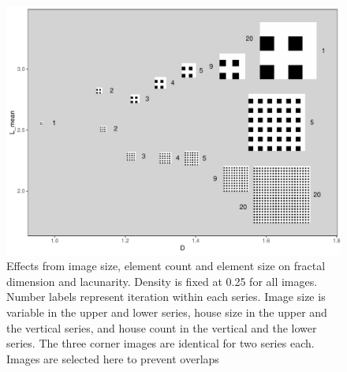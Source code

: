 \documentclass[
  12pt,
  a4paper, twoside]{book}
\begin{document}
\begin{figure}

{\centering \includegraphics[width=0.9\linewidth]{Results/fig08_N_im} 

}

\caption[Effects from image size, count and resolution on fractal dimension (D) and lacunarity (L)]{Effects from image size, element count and element size on fractal dimension and lacunarity. Density is fixed at 0.25 for all images. Number labels represent iteration within each series. Image size is variable in the upper and lower series, house size in the upper and the vertical series, and house count in the vertical and the lower series. The three corner images are identical for two series each. Images are selected here to prevent overlaps}\label{fig:08-N-im}
\end{figure}
\end{document}
